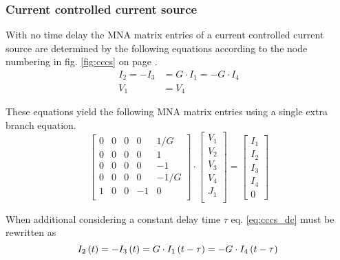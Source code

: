 \subsubsection{Current controlled current source}

With no time delay the MNA matrix entries of a current controlled
current source are determined by the following equations according to
the node numbering in fig. \ref{fig:cccs} on page \pageref{fig:cccs}.
\begin{align}
\label{eq:cccs_dc}
I_2 = -I_3 &= G\cdot I_1 = -G\cdot I_4\\
V_1 &= V_4
\end{align}

These equations yield the following MNA matrix entries using a single
extra branch equation.
\begin{equation}
\begin{bmatrix}
0 & 0 & 0 & 0 & 1/G\\
0 & 0 & 0 & 0 & 1\\
0 & 0 & 0 & 0 & -1\\
0 & 0 & 0 & 0 & -1/G\\
1 & 0 & 0 & -1 & 0\\
\end{bmatrix}
\cdot
\begin{bmatrix}
V_1\\
V_2\\
V_3\\
V_4\\
J_1\\
\end{bmatrix}
=
\begin{bmatrix}
I_1\\
I_2\\
I_3\\
I_4\\
0
\end{bmatrix}
\end{equation}

When additional considering a constant delay time $\tau$
eq. \eqref{eq:cccs_dc} must be rewritten as
\begin{equation}
\label{eq:cccs_delay}
I_2\left(t\right) = -I_3\left(t\right) = G\cdot I_1\left(t -\tau\right) = -G\cdot I_4\left(t -\tau\right)\\
\end{equation}

